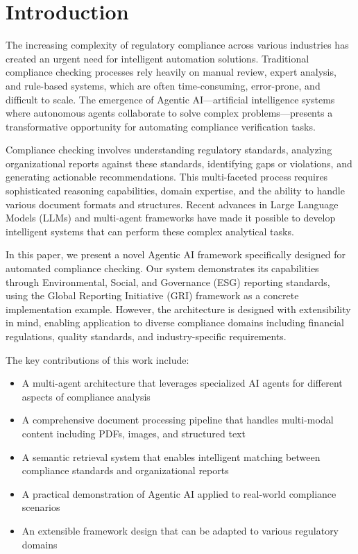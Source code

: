 \documentclass[conference]{IEEEtran}
\begin{document}
\section{Introduction}

The increasing complexity of regulatory compliance across various industries has created an urgent need for intelligent automation solutions. Traditional compliance checking processes rely heavily on manual review, expert analysis, and rule-based systems, which are often time-consuming, error-prone, and difficult to scale. The emergence of Agentic AI—artificial intelligence systems where autonomous agents collaborate to solve complex problems—presents a transformative opportunity for automating compliance verification tasks.

Compliance checking involves understanding regulatory standards, analyzing organizational reports against these standards, identifying gaps or violations, and generating actionable recommendations. This multi-faceted process requires sophisticated reasoning capabilities, domain expertise, and the ability to handle various document formats and structures. Recent advances in Large Language Models (LLMs) and multi-agent frameworks have made it possible to develop intelligent systems that can perform these complex analytical tasks.

In this paper, we present a novel Agentic AI framework specifically designed for automated compliance checking. Our system demonstrates its capabilities through Environmental, Social, and Governance (ESG) reporting standards, using the Global Reporting Initiative (GRI) framework as a concrete implementation example. However, the architecture is designed with extensibility in mind, enabling application to diverse compliance domains including financial regulations, quality standards, and industry-specific requirements.

The key contributions of this work include:
\begin{itemize}
\item A multi-agent architecture that leverages specialized AI agents for different aspects of compliance analysis
\item A comprehensive document processing pipeline that handles multi-modal content including PDFs, images, and structured text
\item A semantic retrieval system that enables intelligent matching between compliance standards and organizational reports
\item A practical demonstration of Agentic AI applied to real-world compliance scenarios
\item An extensible framework design that can be adapted to various regulatory domains
\end{itemize}
\end{document}
